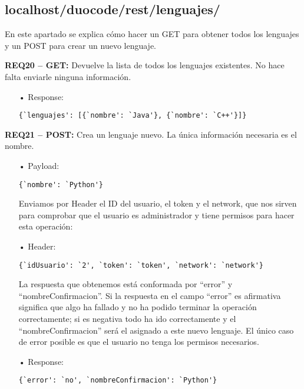 \subsection{localhost/duocode/rest/lenguajes/}
En este apartado se explica cómo hacer un GET para obtener todos los lenguajes y un POST para crear un nuevo lenguaje.
\vspace{1em}

\textbf{REQ20 – GET:} Devuelve la lista de todos los lenguajes existentes. No hace falta enviarle ninguna información.
  
\begin{itemize}
\item[•]
Response:
{\codesize
\begin{verbatim} 
{`lenguajes': [{`nombre': `Java'}, {`nombre': `C++'}]}
\end{verbatim}
}
\end{itemize}

\textbf{REQ21 – POST:} Crea un lenguaje nuevo. La única información necesaria es el nombre.

\begin{itemize}
\item[•]
Payload: 
{\codesize
\begin{verbatim}
{`nombre': `Python'}
\end{verbatim}
}

Enviamos por Header el ID del usuario, el token y el network, que nos sirven para comprobar que el usuario es administrador y tiene permisos para hacer esta operación:

\item[•]
Header: 
{\codesize
\begin{verbatim}
{`idUsuario': `2', `token': `token', `network': `network'}
\end{verbatim}
}

La respuesta que obtenemos está conformada por ``error'' y ``nombreConfirmacion''. Si la respuesta en el campo ``error'' es afirmativa significa que algo ha fallado y no ha podido terminar la operación correctamente; si es negativa todo ha ido correctamente y el ``nombreConfirmacion'' será el asignado a este nuevo lenguaje. El único caso de error posible es que el usuario no tenga los permisos necesarios.

\item[•]
Response: 
{\codesize
\begin{verbatim}
{`error': `no', `nombreConfirmacion': `Python'}
\end{verbatim}
}
\end{itemize}

